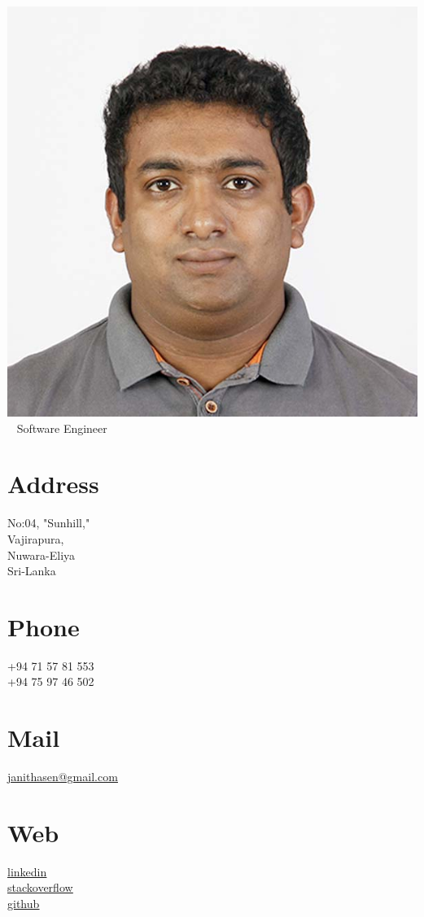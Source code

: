 \documentclass[]{cv-class}
\begin{document}
\begin{aside}
\color{blue}
  \includegraphics[scale=0.9]{img/photo.jpg}
    ~
      {Software Engineer}
   ~
  \section{Address}
    {\whitebodyfont No:04, "Sunhill,"\\
    Vajirapura,\\
    Nuwara-Eliya\\
    Sri-Lanka}
    ~
  \section{Phone}
    {\whitebodyfont +94 71 57 81 553\\
    +94 75 97 46 502}
    ~
  \section{Mail}
    \underline{\href{mailto:janithasen@gmail.com}{{\whitebodyfont janithasen@gmail.com}}}
    ~
  \section{Web}
  	\vspace{0.10cm}
    \underline{\href{https://www.linkedin.com/in/janithamadushan}{{\whitebodyfont linkedin}}}
    \\
	\vspace{0.10cm}
    \underline{\href{https://stackoverflow.com/story/jmadushan}{{\whitebodyfont stackoverflow}}}
	\\	
	\vspace{0.10cm}
    \underline{\href{https://github.com/janitham}{{\whitebodyfont github}}}
    ~

\end{aside}
\end{document}
